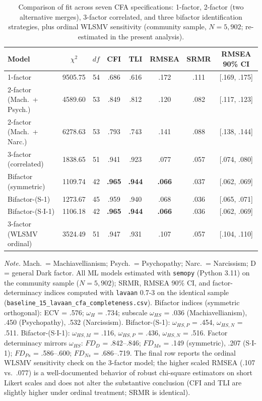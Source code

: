 \documentclass[11pt,twocolumn]{article}
\begin{document}
\begin{table}[!t]
\centering
\caption{Comparison of fit across seven CFA specifications: 1-factor, 2-factor (two alternative merges), 3-factor correlated, and three bifactor identification strategies, plus ordinal WLSMV sensitivity (community sample, $N = 5{,}902$; re-estimated in the present analysis).}
\label{tab:cfa}
\footnotesize
\begin{tabular}{lccccccc}
\toprule
Model & $\chi^2$ & $df$ & CFI & TLI & RMSEA & SRMR & RMSEA 90\% CI \\
\midrule
1-factor & 9505.75 & 54 & .686 & .616 & .172 & .111 & [.169, .175] \\
2-factor (Mach.\ + Psych.) & 4589.60 & 53 & .849 & .812 & .120 & .082 & [.117, .123] \\
2-factor (Mach.\ + Narc.) & 6278.63 & 53 & .793 & .743 & .141 & .088 & [.138, .144] \\
3-factor (correlated) & 1838.65 & 51 & .941 & .923 & .077 & .057 & [.074, .080] \\
Bifactor (symmetric) & 1109.74 & 42 & \textbf{.965} & \textbf{.944} & \textbf{.066} & .037 & [.062, .069] \\
Bifactor-(S-1) & 1273.67 & 45 & .959 & .940 & .068 & .036 & [.065, .071] \\
Bifactor-(S$\cdot$I-1) & 1106.18 & 42 & \textbf{.965} & \textbf{.944} & \textbf{.066} & .036 & [.062, .069] \\
\midrule
3-factor (WLSMV ordinal) & 3524.49 & 51 & .947 & .931 & .107 & .057 & [.104, .110] \\
\bottomrule
\end{tabular}
\par\smallskip
\footnotesize\raggedright
\textit{Note.} Mach.\ = Machiavellianism; Psych.\ = Psychopathy; Narc.\ = Narcissism; D = general Dark factor. All ML models estimated with \texttt{semopy} (Python 3.11) on the community sample ($N = 5{,}902$); SRMR, RMSEA 90\% CI, and factor-determinacy indices computed with \texttt{lavaan} 0.7-3 on the identical sample (\texttt{baseline\_15\_lavaan\_cfa\_completeness.csv}). Bifactor indices (symmetric orthogonal): ECV = .576; $\omega_H$ = .734; subscale $\omega_{HS}$ = .036 (Machiavellianism), .450 (Psychopathy), .532 (Narcissism). Bifactor-(S-1): $\omega_{HS,P}$ = .454, $\omega_{HS,N}$ = .511. Bifactor-(S$\cdot$I-1): $\omega_{HS,M}$ = .116, $\omega_{HS,P}$ = .436, $\omega_{HS,N}$ = .516. Factor determinacy mirrors $\omega_{HS}$: $FD_D$ = .842--.846; $FD_{Ms}$ = .149 (symmetric), .207 (S$\cdot$I-1); $FD_{Ps}$ = .586--.600; $FD_{Ns}$ = .686--.719. The final row reports the ordinal WLSMV sensitivity check on the 3-factor model; the higher scaled RMSEA (.107 vs.\ .077) is a well-documented behavior of robust chi-square estimators on short Likert scales \citep{rhemtulla2012} and does not alter the substantive conclusion (CFI and TLI are slightly higher under ordinal treatment; SRMR is identical).
\end{table}
\end{document}
